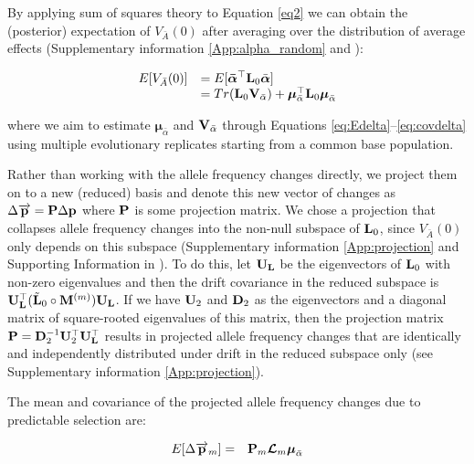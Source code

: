 \documentclass[12pt]{article}
\begin{document}
\begin{bibunit}
By applying sum of squares theory \citep[page 355]{searle2006} to Equation \ref{eq2} we can obtain the (posterior) expectation of $V_{\bar A}(0)$ after averaging over the distribution of average effects (Supplementary information \ref{App:alpha_random} and \citet{gianola2009additive}):

\begin{equation} \label{eq6}
\begin{array}{rl}
E[V_{\bar A}(0)] &= E[\boldsymbol{\bar \alpha}^{\top}\textbf{L}_0\bar{\boldsymbol{\alpha}}]\\
&= Tr(\textbf{L}_0{\bf V}_{\bar{\alpha}}) + \boldsymbol{\mu}_{\bar{\alpha}}^{\top}\textbf{L}_0\boldsymbol{\mu}_{\bar{\alpha}}\\
\end{array}
\end{equation}

where we aim to estimate $\boldsymbol{\mu}_{\bar{\alpha}}$ and ${\bf V}_{\bar{\alpha}}$ through Equations \ref{eq:Edelta}--\ref{eq:covdelta} using multiple evolutionary replicates starting from a common base population.


Rather than working with the allele frequency changes directly, we project them on to a new (reduced) basis and denote this new vector of changes as $\Delta\overrightarrow{\bf p} = {\bf P}\Delta{\bf p}$ where ${\bf P}$ is some projection matrix. We chose a projection that collapses allele frequency changes into the non-null subspace of ${\bf L}_{0}$, since $V_{\bar A}(0)$ only depends on this subspace (Supplementary information \ref{App:projection} and Supporting Information in \citet{de2015genomic}). To do this, let ${\bf U}_{\bf L}$ be the eigenvectors of ${\bf L}_{0}$ with non-zero eigenvalues and then the drift covariance in the reduced subspace is ${\bf U}_{\bf L}^{\top}(\tilde{\bf L}_{0}\circ{\bf M}^{(m)}){\bf U}_{\bf L}$. If we have ${\bf U}_2$ and ${\bf D}_2$ as the eigenvectors and a diagonal matrix of square-rooted eigenvalues of this matrix, then the projection matrix ${\bf P} = {\bf D}_2^{-1}{\bf U}_2^{\top}{\bf U}_{\bf L}^{\top}$ results in projected allele frequency changes that are identically and independently distributed under drift in the reduced subspace only (see Supplementary information \ref{App:projection}).

The mean and covariance of the projected allele frequency changes due to predictable selection are:

\begin{equation} 
\begin{array}{rl}
E[\Delta \overrightarrow{\bf p}_m] = &
{\bf P}_{m}\boldsymbol{\mathcal{L}}_m
\boldsymbol{\mu}_{\bar{\alpha}}
\end{array}
\end{equation}


\end{bibunit}
\end{document}

